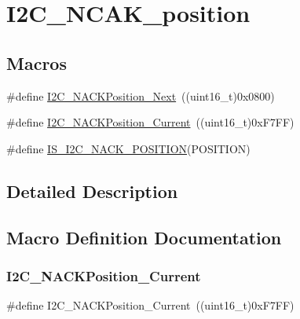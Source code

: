\hypertarget{group___i2_c___n_c_a_k__position}{}\section{I2\+C\+\_\+\+N\+C\+A\+K\+\_\+position}
\label{group___i2_c___n_c_a_k__position}
\subsection*{Macros}
\begin{DoxyCompactItemize}
\item 
\#define \mbox{\hyperlink{group___i2_c___n_c_a_k__position_gacb512a4bd4841a763b6ec51606687fca}{I2\+C\+\_\+\+N\+A\+C\+K\+Position\+\_\+\+Next}}~((uint16\+\_\+t)0x0800)
\item 
\#define \mbox{\hyperlink{group___i2_c___n_c_a_k__position_ga8d91c1e62730a9d927ca8e9ec4f7ef8f}{I2\+C\+\_\+\+N\+A\+C\+K\+Position\+\_\+\+Current}}~((uint16\+\_\+t)0x\+F7\+F\+F)
\item 
\#define \mbox{\hyperlink{group___i2_c___n_c_a_k__position_ga631b4b1674a12aa2b3b27360983029e3}{I\+S\+\_\+\+I2\+C\+\_\+\+N\+A\+C\+K\+\_\+\+P\+O\+S\+I\+T\+I\+ON}}(P\+O\+S\+I\+T\+I\+ON)
\end{DoxyCompactItemize}


\subsection{Detailed Description}


\subsection{Macro Definition Documentation}
\mbox{\label{group___i2_c___n_c_a_k__position_ga8d91c1e62730a9d927ca8e9ec4f7ef8f}} 
\subsubsection{\texorpdfstring{I2C\_NACKPosition\_Current}{I2C\_NACKPosition\_Current}}
{\footnotesize\ttfamily \#define I2\+C\+\_\+\+N\+A\+C\+K\+Position\+\_\+\+Current~((uint16\+\_\+t)0x\+F7\+F\+F)}

\mbox{\label{group___i2_c___n_c_a_k__position_gacb512a4bd4841a763b6ec51606687fca}} 

